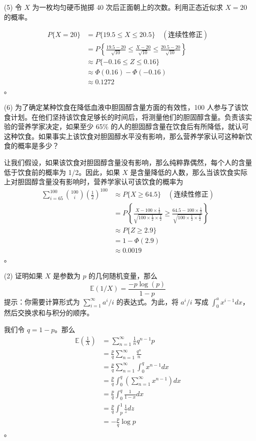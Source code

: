 \begin{questions}
\question (5) 令 $X$ 为一枚均匀硬币抛掷 40 次后正面朝上的次数。利用正态近似求 $X = 20$ 的概率。

\begin{solution}
\begin{align*}
P\{X = 20\} &= P\{19.5 \le X \le 20.5\} \quad (连续性修正) \\
&= P\left\{ \frac{19.5 - 20}{\sqrt{10}} \le \frac{X - 20}{\sqrt{10}} \le \frac{20.5 - 20}{\sqrt{10}} \right\} \\
&\approx P\{-0.16 \le Z \le 0.16\} \\
&\approx \Phi(0.16) - \Phi(-0.16) \\
&\approx 0.1272
\end{align*}。
\end{solution}

\question (6) 为了确定某种饮食在降低血液中胆固醇含量方面的有效性，100 人参与了该饮食计划。在他们坚持该饮食足够长的时间后，将测量他们的胆固醇含量。负责该实验的营养学家决定，如果至少 65\% 的人的胆固醇含量在饮食后有所降低，就认可这种饮食。如果事实上该饮食对胆固醇水平没有影响，那么营养学家认可这种新饮食的概率是多少？

\begin{solution}
让我们假设，如果该饮食对胆固醇含量没有影响，那么纯粹靠偶然，每个人的含量低于饮食前的概率为 1/2。因此，如果 $X$ 是含量降低的人数，那么当该饮食实际上对胆固醇含量没有影响时，营养学家认可该饮食的概率为
\begin{align*}
\sum_{i=65}^{100} \binom{100}{i} \left(\frac{1}{2}\right)^{100} &\approx P\{X \ge 64.5\} \quad (连续性修正) \\
&= P\left\{ \frac{X - 100 \times \frac{1}{2}}{\sqrt{100 \times \frac{1}{2} \times \frac{1}{2}}} \ge \frac{64.5 - 100 \times \frac{1}{2}}{\sqrt{100 \times \frac{1}{2} \times \frac{1}{2}}} \right\} \\
&\approx P\{Z \ge 2.9\} \\
&= 1 - \Phi(2.9) \\
&\approx 0.0019
\end{align*}。
\end{solution}

\question (2) 证明如果 $X$ 是参数为 $p$ 的几何随机变量，那么
\[
\mathbb{E}(1/X) = \frac{-p \log(p)}{1 - p}
\]
提示：你需要计算形式为 $\sum_{i=1}^{\infty} a^i/i$ 的表达式。为此，将 $a^i/i$ 写成 $\int_0^a x^{i-1} dx$，然后交换求和与积分的顺序。

\begin{solution}
我们令 $q = 1 - p$。那么
\begin{align*}
\mathbb{E}\left(\frac{1}{X}\right) &= \sum_{n=1}^{\infty} \frac{1}{n} q^{n-1} p \\
&= \frac{p}{q} \sum_{n=1}^{\infty} \frac{q^n}{n} \\
&= \frac{p}{q} \sum_{n=1}^{\infty} \int_0^q x^{n-1} dx \\
&= \frac{p}{q} \int_0^q \left(\sum_{n=1}^{\infty} x^{n-1}\right) dx \\
&= \frac{p}{q} \int_0^q \frac{1}{1-x} dx \\
&= \frac{p}{q} \int_p^1 \frac{1}{z} dz \\
&= -\frac{p}{q} \log p
\end{align*}。
\end{solution}


\end{questions}
